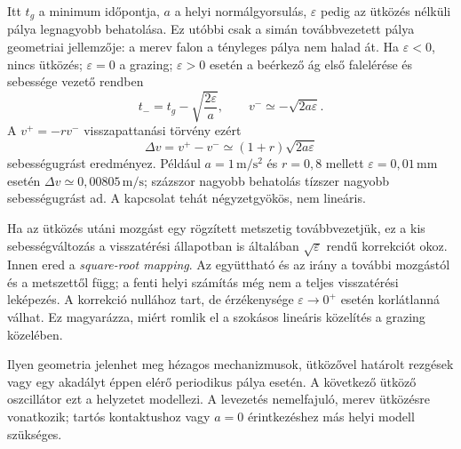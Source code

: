 Itt $t_g$ a minimum időpontja, $a$ a helyi normálgyorsulás, $\varepsilon$ pedig az ütközés nélküli pálya legnagyobb behatolása. Ez utóbbi csak a simán továbbvezetett pálya geometriai jellemzője: a merev falon a tényleges pálya nem halad át. Ha $\varepsilon<0$, nincs ütközés; $\varepsilon=0$ a grazing; $\varepsilon>0$ esetén a beérkező ág első falelérése és sebessége vezető rendben
\begin{equation}\label{eq:grazing_motivation_speed}
t_-=t_g-\sqrt{\frac{2\varepsilon}{a}},\qquad
v^-\simeq-\sqrt{2a\varepsilon}.
\end{equation}
A $v^+=-rv^-$ visszapattanási törvény ezért
\begin{equation}\label{eq:grazing_motivation_jump}
\Delta v=v^+-v^-\simeq(1+r)\sqrt{2a\varepsilon}
\end{equation}
sebességugrást eredményez. Például $a=1\,\mathrm{m/s^2}$ és $r=0{,}8$ mellett $\varepsilon=0{,}01\,\mathrm{mm}$ esetén $\Delta v\simeq0{,}00805\,\mathrm{m/s}$; százszor nagyobb behatolás tízszer nagyobb sebességugrást ad. A kapcsolat tehát négyzetgyökös, nem lineáris.

Ha az ütközés utáni mozgást egy rögzített metszetig továbbvezetjük, ez a kis sebességváltozás a visszatérési állapotban is általában $\sqrt{\varepsilon}$ rendű korrekciót okoz. Innen ered a \emph{square-root mapping}. Az együttható és az irány a további mozgástól és a metszettől függ; a fenti helyi számítás még nem a teljes visszatérési leképezés. A korrekció nullához tart, de érzékenysége $\varepsilon\to0^+$ esetén korlátlanná válhat. Ez magyarázza, miért romlik el a szokásos lineáris közelítés a grazing közelében.

Ilyen geometria jelenhet meg hézagos mechanizmusok, ütközővel határolt rezgések vagy egy akadályt éppen elérő periodikus pálya esetén. A következő ütköző oszcillátor ezt a helyzetet modellezi. A levezetés nemelfajuló, merev ütközésre vonatkozik; tartós kontaktushoz vagy $a=0$ érintkezéshez más helyi modell szükséges.


